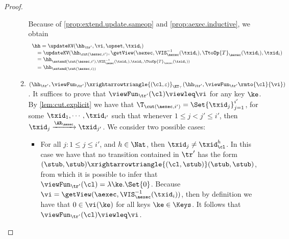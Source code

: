 \begin{proof}
\begin{itemize}
\begin{enumerate}
Because of \cref{prop:extend.update.sameop} and \cref{prop:aexec.inductive},
we obtain 
\[
\begin{array}{l}
\hh = \updateKV(\hh_{\tr'}, \vi, \opset, \txid_{i}) \\
\quad = \updateKV(\hh_{\cut(\aexec, i')}, \getView(\aexec, \VIS^{-1}_{\aexec}(\txid_{i}), \TtoOp{T}_{\aexec}(\txid_{i}), \txid_{i}) \\
\quad = \hh_{\extend(\cut(\aexec, i'), \VIS^{-1}_{\aexec}(\txid_{i}), \txid_{i}, \TtoOp{T}_{\aexec}(\txid_{i})) } \\
\quad = \hh_{\extend(\cut(\aexec, i))}
\end{array}
\]

\item $(\hh_{\tr'}, \viewFun_{\tr'}) \xrightarrowtriangle{(\cl, \varepsilon)}_{\ET_{\top}} (\hh_{\tr'}, \viewFun_{\tr'}\rmto{\cl}{\vi})$. 
It suffices to prove that $\viewFun_{\tr'}(\cl) \viewleq \vi$ for any key $\ke$.
By \cref{lem:cut.explicit} we have that $\T_{\cut(\aexec, i')} = \Set{\txid_{j}}_{j=1}^{i'}$, for 
some $\txid_{1},\cdots, \txid_{i'}$ such that whenever $1 \leq j < j' \leq i'$, then 
$\txid_{j} \xrightarrow{\AR_{\aexec}} \txid_{j'}$. We consider two possible cases: 

\begin{itemize}
\item For all $j : 1 \leq j \leq i'$, and $h \in \Nat$, then $\txid_{j} \neq \txid_{\cl}^{h}$.
In this case we have that no transition contained in $\tr'$ has the form 
$(\stub, \stub) \xrightarrowtriangle{(\cl, \stub)} (\stub, \stub)$, from which it is possible to infer 
that  $\viewFun_{\tr'}(\cl) = \lambda \ke. \Set{0}$. Because $\vi = \getView(\aexec, \VIS^{-1}_{\aexec}(\txid_{i}))$, 
then by definition we have that $0 \in \vi(\ke)$ for all keys $\ke \in \Keys$. It follows that 
$\viewFun_{\tr'}(\cl) \viewleq \vi$. 


\end{itemize}
\end{enumerate}
\end{itemize}
\end{proof}
